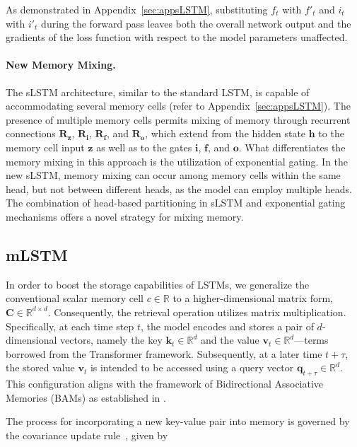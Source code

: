 As demonstrated in Appendix~\ref{sec:appsLSTM}, substituting $f_t$ with $f'_t$ and $i_t$ with $i'_t$ during the forward pass leaves both the overall network output and the gradients of the loss function with respect to the model parameters unaffected.

\paragraph{New Memory Mixing.} The sLSTM architecture, similar to the standard LSTM, is capable of accommodating several memory cells (refer to Appendix~\ref{sec:appsLSTM}). The presence of multiple memory cells permits mixing of memory through recurrent connections $\mathbf{R}_{\mathbf{z}}$, $\mathbf{R}_{\mathbf{i}}$, $\mathbf{R}_{\mathbf{f}}$, and $\mathbf{R}_{\mathbf{o}}$, which extend from the hidden state $\mathbf{h}$ to the memory cell input $\mathbf{z}$ as well as to the gates $\mathbf{i}$, $\mathbf{f}$, and $\mathbf{o}$. What differentiates the memory mixing in this approach is the utilization of exponential gating. In the new sLSTM, memory mixing can occur among memory cells within the same head, but not between different heads, as the model can employ multiple heads. The combination of head-based partitioning in sLSTM and exponential gating mechanisms offers a novel strategy for mixing memory.

\subsection{mLSTM}
\label{sec:mLSTM}

In order to boost the storage capabilities of LSTMs, we generalize the conventional scalar memory cell $c \in \mathbb{R}$ to a higher-dimensional matrix form, $\mathbf{C} \in \mathbb{R}^{d \times d}$. Consequently, the retrieval operation utilizes matrix multiplication. Specifically, at each time step $t$, the model encodes and stores a pair of $d$-dimensional vectors, namely the key $\mathbf{k}_t \in \mathbb{R}^d$ and the value $\mathbf{v}_t \in \mathbb{R}^d$—terms borrowed from the Transformer framework. Subsequently, at a later time $t + \tau$, the stored value $\mathbf{v}_t$ is intended to be accessed using a query vector $\mathbf{q}_{t+\tau} \in \mathbb{R}^d$. This configuration aligns with the framework of Bidirectional Associative Memories (BAMs) as established in \citep{Kohonen:72,Anderson:72,Nakano:72,Anderson:77}.

The process for incorporating a new key-value pair into memory is governed by the covariance update rule~\citep{Sejnowski:77,Dayan:91}, given by

